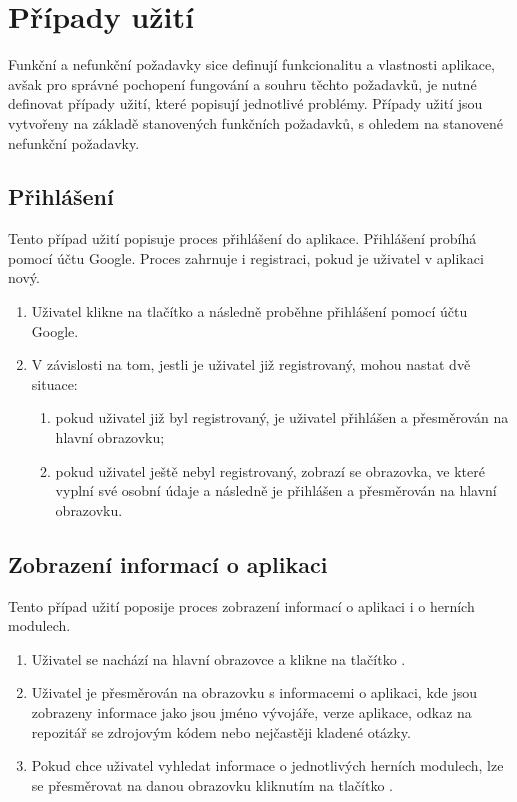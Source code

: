 \let\oldsubsection=\thesubsection
\renewcommand\thesubsection{UC\arabic{subsection}} %

\section{Případy užití}

Funkční a nefunkční požadavky sice definují funkcionalitu a vlastnosti aplikace,
avšak pro správné pochopení fungování a souhru těchto požadavků,
je nutné definovat případy užití,
které popisují jednotlivé problémy.
Případy užití jsou vytvořeny na základě stanovených funkčních požadavků,
s ohledem na stanovené nefunkční požadavky.

\subsection{Přihlášení}
\label{uc:login}

Tento případ užití popisuje proces přihlášení do aplikace.
Přihlášení probíhá pomocí účtu Google.
Proces zahrnuje i registraci,
pokud je uživatel v aplikaci nový.

\begin{enumerate}
    \item Uživatel klikne na tlačítko 
    a následně proběhne přihlášení pomocí účtu Google.
    \item V závislosti na tom,
    jestli je uživatel již registrovaný,
    mohou nastat dvě situace:
    \begin{enumerate}
        \item pokud uživatel již byl registrovaný,
        je uživatel přihlášen a přesměrován na hlavní obrazovku;
        \item pokud uživatel ještě nebyl registrovaný,
        zobrazí se obrazovka,
        ve které vyplní své osobní údaje
        a následně je přihlášen a přesměrován na hlavní obrazovku.
    \end{enumerate}
\end{enumerate}

\subsection{Zobrazení informací o aplikaci}

Tento případ užití poposije proces zobrazení informací o aplikaci
i o herních modulech.

\begin{enumerate}
    \item Uživatel se nachází na hlavní obrazovce a klikne na tlačítko
    .
    \item Uživatel je přesměrován na obrazovku s informacemi o aplikaci,
    kde jsou zobrazeny informace jako jsou jméno vývojáře, verze aplikace,
    odkaz na repozitář se zdrojovým kódem nebo nejčastěji kladené otázky.
    \item Pokud chce uživatel vyhledat informace o jednotlivých herních
    modulech,
    lze se přesměrovat na danou obrazovku kliknutím na tlačítko
    .
\end{enumerate}

